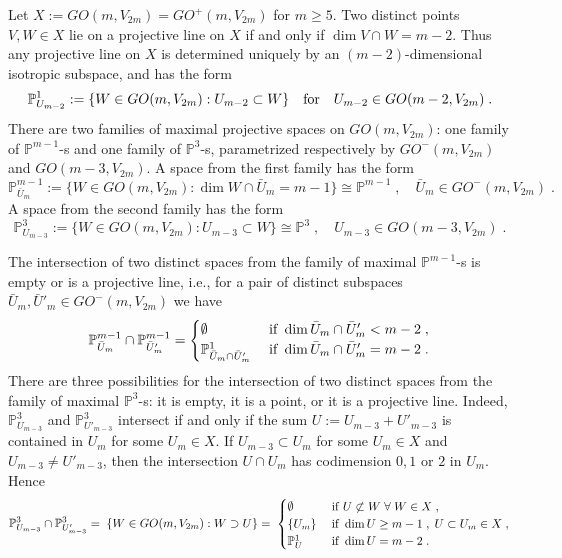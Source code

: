 \documentclass[12pt]{amsart}
\def\PP {{\mathbb P}}     %
\begin{document}
Let $X:=GO(m,V_{2m})=GO^+(m,V_{2m})$ for $m\geq 5$. Two distinct points $V,W\in X$ lie on a projective line on $X$ if and only if $\dim V\cap W=m-2$. Thus any projective line on $X$ is determined uniquely by an $(m-2)$-dimensional isotropic subspace, and has the form
\begin{gather}\label{For Lines on Spinor}
\PP^1_{U_{m-2}}:=\{W\in GO(m,V_{2m}): U_{m-2}\subset W\}\quad{\rm for}\quad U_{m-2}\in GO(m-2,V_{2m})\;.
\end{gather}
There are two families of maximal projective spaces on $GO(m,V_{2m})$: one family of $\PP^{m-1}$-s and one family of $\PP^3$-s, parametrized respectively by $GO^-(m,V_{2m})$ and $GO(m-3,V_{2m})$. A space from the first family has the form
$$
\PP^{m-1}_{\bar U_{m}}:= \{W\in GO(m,V_{2m}) : \dim W\cap \bar U_{m}= m-1 \}  \cong \PP^{m-1} \;,\quad \bar U_{m}\in GO^-(m,V_{2m})\;.
$$
A space from the second family has the form
$$
\PP^3_{U_{m-3}} := \{W\in GO(m,V_{2m}) : U_{m-3} \subset W \} \cong \PP^3\;,\quad U_{m-3}\in GO(m-3,V_{2m})\;.
$$

The intersection of two distinct spaces from the family of maximal $\PP^{m-1}$-s is empty or is a projective line, i.e., for a pair of distinct subspaces $\bar U_{m},\bar U'_{m}\in GO^-(m,V_{2m})$ we have
$$
\PP^{m-1}_{\bar U_{m}} \cap \PP^{m-1}_{\bar U'_{m}}  = \begin{cases} \emptyset & \;{\rm if}\; \dim \bar U_{m}\cap \bar U'_{m} <m-2\;, \\ \PP^1_{\bar U_{m}\cap \bar U'_{m}} & \;{\rm if}\; \dim \bar U_{m}\cap \bar U'_{m} = m-2 \;. \end{cases}
$$
There are three possibilities for the intersection of two distinct spaces from the family of maximal $\PP^3$-s: it is empty, it is a point, or it is a projective line. Indeed, $\PP^{3}_{U_{m-3}}$ and $\PP^{3}_{U'_{m-3}}$ intersect if and only if the sum $U:=U_{m-3}+U'_{m-3}$ is contained in $U_m$ for some $U_m\in X$. If $U_{m-3}\subset U_m$ for some $U_m\in X$ and $U_{m-3}\ne U'_{m-3}$, then the intersection $U\cap U_m$ has codimension $0,1$ or $2$ in $U_m$. Hence
$$
\PP^{3}_{U_{m-3}} \cap \PP^{3}_{U'_{m-3}}  =\;\{ W\in GO(m,V_{2m}): W\supset U \} =\;\begin{cases} \emptyset & \;{\rm if}\; U\not\subset W\; \forall\; W\in X\;,\\
\{U_m\} & \;{\rm if}\; \dim U\geq m-1\;,\; U\subset U_m\in X\;,\\  
\PP^1_{U} & \;{\rm if}\; \dim U = m-2 \;.
\end{cases}
$$
\end{document}
